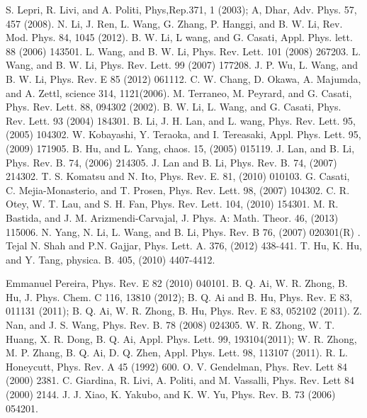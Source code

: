 \documentclass[pra,preprint,superscriptaddress,showkeys,showpacs]{revtex4}
\begin{document}
\begin{thebibliography}{}
S. Lepri, R. Livi, and A. Politi, Phys,Rep.371, 1
(2003); A, Dhar, Adv. Phys. 57, 457 (2008).
N. Li, J. Ren, L. Wang, G. Zhang, P. Hanggi, and B. W.
Li, Rev. Mod. Phys. 84, 1045 (2012).
B. W. Li, L wang, and G. Casati, Appl. Phys.
lett. 88  (2006) 143501.
L. Wang, and B. W. Li, Phys. Rev. Lett. 101 (2008)
267203.
L. Wang, and B. W. Li, Phys. Rev. Lett. 99 (2007)
177208.
J. P. Wu, L. Wang, and B. W. Li, Phys. Rev. E 85
(2012) 061112.
C. W. Chang, D. Okawa, A. Majumda, and A. Zettl, science
314, 1121(2006).
M. Terraneo, M. Peyrard, and G. Casati, Phys. Rev. Lett. 88,
094302 (2002).
B. W. Li, L. Wang, and G. Casati, Phys. Rev.
Lett. 93 (2004) 184301.
B. Li, J. H. Lan, and L. wang, Phys. Rev. Lett. 95, (2005)
104302.
W. Kobayashi, Y. Teraoka, and I. Tereasaki, Appl. Phys. Lett.
95, (2009) 171905.
B. Hu, and L. Yang, chaos. 15, (2005) 015119.
J. Lan, and B. Li, Phys. Rev. B. 74, (2006) 214305.
J. Lan and B. Li, Phys. Rev. B. 74, (2007) 214302.
T. S. Komatsu and N. Ito, Phys. Rev. E. 81, (2010) 010103.
G. Casati, C. Mejia-Monasterio, and T. Prosen, Phys. Rev.
Lett. 98, (2007) 104302.
C. R. Otey, W. T. Lau, and S. H. Fan, Phys. Rev. Lett. 104, (2010)
154301.
M. R. Bastida, and J. M. Arizmendi-Carvajal, J. Phys. A: Math. Theor. 46, (2013)
115006.
N. Yang, N. Li, L. Wang, and B. Li, Phys. Rev. B 76, (2007)
020301(R) .
Tejal N. Shah and P.N. Gajjar, Phys. Lett. A. 376, (2012)
438-441.
T. Hu, K. Hu, and Y. Tang, physica. B. 405, (2010)
4407-4412.

Emmanuel Pereira, Phys. Rev. E 82 (2010) 040101.
B. Q. Ai, W. R. Zhong, B. Hu, J. Phys. Chem. C 116, 13810 (2012); B. Q. Ai and B. Hu, Phys. Rev. E 83, 011131 (2011); B. Q. Ai, W. R. Zhong, B. Hu, Phys. Rev. E 83, 052102 (2011).
Z. Nan, and J. S. Wang, Phys. Rev. B. 78 (2008) 024305.
W. R. Zhong, W. T. Huang, X. R. Dong, B. Q. Ai, Appl. Phys. Lett. 99, 193104(2011); W. R. Zhong, M. P. Zhang, B. Q. Ai, D. Q. Zhen, Appl. Phys. Lett. 98, 113107 (2011).
R. L. Honeycutt, Phys. Rev. A 45 (1992) 600.
O. V. Gendelman, Phys. Rev. Lett 84 (2000) 2381.
C. Giardina, R. Livi, A. Politi, and M. Vassalli, Phys. Rev. Lett 84 (2000) 2144.
J. J. Xiao, K. Yakubo, and K. W. Yu, Phys. Rev. B. 73
(2006) 054201.
\end{thebibliography}
\end{document}
